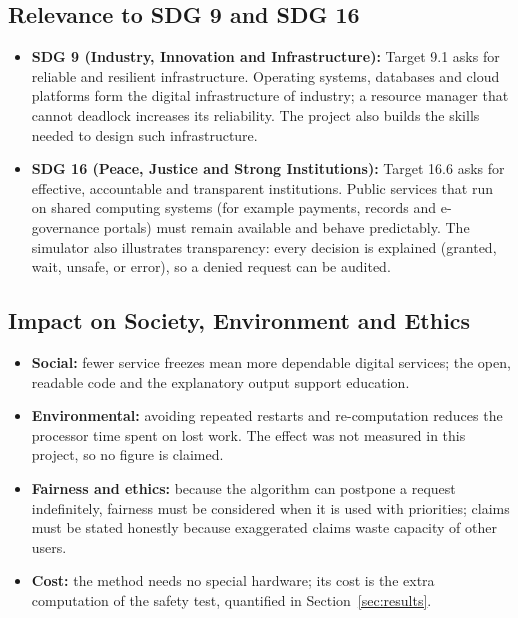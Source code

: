 \documentclass[11pt,a4paper]{report}
\begin{document}
\subsection{Relevance to SDG 9 and SDG 16}
\begin{itemize}
    \item \textbf{SDG 9 (Industry, Innovation and Infrastructure):} Target 9.1 asks for reliable and resilient infrastructure. Operating systems, databases and cloud platforms form the digital infrastructure of industry; a resource manager that cannot deadlock increases its reliability. The project also builds the skills needed to design such infrastructure.
    \item \textbf{SDG 16 (Peace, Justice and Strong Institutions):} Target 16.6 asks for effective, accountable and transparent institutions. Public services that run on shared computing systems (for example payments, records and e-governance portals) must remain available and behave predictably. The simulator also illustrates transparency: every decision is explained (granted, wait, unsafe, or error), so a denied request can be audited.
\end{itemize}

\subsection{Impact on Society, Environment and Ethics}
\begin{itemize}
    \item \textbf{Social:} fewer service freezes mean more dependable digital services; the open, readable code and the explanatory output support education.
    \item \textbf{Environmental:} avoiding repeated restarts and re-computation reduces the processor time spent on lost work. The effect was not measured in this project, so no figure is claimed.
    \item \textbf{Fairness and ethics:} because the algorithm can postpone a request indefinitely, fairness must be considered when it is used with priorities; claims must be stated honestly because exaggerated claims waste capacity of other users.
    \item \textbf{Cost:} the method needs no special hardware; its cost is the extra computation of the safety test, quantified in Section~\ref{sec:results}.
\end{itemize}

\end{document}
